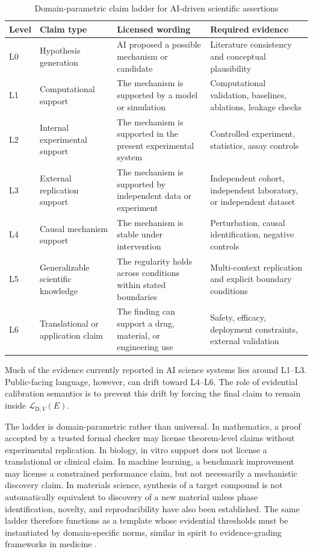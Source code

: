 \documentclass[11pt,a4paper]{article}
\newcommand{\Dom}{\mathsf{D}}
\begin{document}
\begin{table}[htbp]
\centering
\small
\caption{Domain-parametric claim ladder for AI-driven scientific assertions}
\begin{tabularx}{\textwidth}{@{}p{1.1cm}p{3cm}Y Y@{}}
\toprule
Level & Claim type & Licensed wording & Required evidence \\
\midrule
L0 & Hypothesis generation & AI proposed a possible mechanism or candidate & Literature consistency and conceptual plausibility \\
L1 & Computational support & The mechanism is supported by a model or simulation & Computational validation, baselines, ablations, leakage checks \\
L2 & Internal experimental support & The mechanism is supported in the present experimental system & Controlled experiment, statistics, assay controls \\
L3 & External replication support & The mechanism is supported by independent data or experiment & Independent cohort, independent laboratory, or independent dataset \\
L4 & Causal mechanism support & The mechanism is stable under intervention & Perturbation, causal identification, negative controls \\
L5 & Generalizable scientific knowledge & The regularity holds across conditions within stated boundaries & Multi-context replication and explicit boundary conditions \\
L6 & Translational or application claim & The finding can support a drug, material, or engineering use & Safety, efficacy, deployment constraints, external validation \\
\bottomrule
\end{tabularx}
\end{table}

Much of the evidence currently reported in AI science systems lies around L1--L3. Public-facing language, however, can drift toward L4--L6. The role of evidential calibration semantics is to prevent this drift by forcing the final claim to remain inside $\mathcal{L}_{\Dom,V}(E)$.

The ladder is domain-parametric rather than universal. In mathematics, a proof accepted by a trusted formal checker may license theorem-level claims without experimental replication. In biology, in vitro support does not license a translational or clinical claim. In machine learning, a benchmark improvement may license a constrained performance claim, but not necessarily a mechanistic discovery claim. In materials science, synthesis of a target compound is not automatically equivalent to discovery of a new material unless phase identification, novelty, and reproducibility have also been established. The same ladder therefore functions as a template whose evidential thresholds must be instantiated by domain-specific norms, similar in spirit to evidence-grading frameworks in medicine \citep{Guyatt2008GRADE}.
\end{document}
